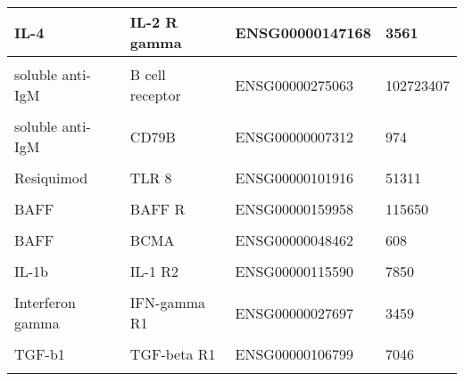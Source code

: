 \documentclass[11pt, a4paper, twosided]{book}
\begin{document}
\begin{table}
\begin{tabular}[t]{l|l|l|l}
\hline
IL-4 & IL-2 R gamma & ENSG00000147168 & 3561\\
\hline
\cellcolor[HTML]{E2E868}{IL-4} & \cellcolor[HTML]{E2E868}{IL-13 R A1} & \cellcolor[HTML]{E2E868}{ENSG00000131724} & \cellcolor[HTML]{E2E868}{3597}\\
\hline
soluble anti-IgM & B cell receptor & ENSG00000275063 & 102723407\\
\hline
\cellcolor[HTML]{E2E868}{soluble anti-IgM} & \cellcolor[HTML]{E2E868}{CD79A} & \cellcolor[HTML]{E2E868}{ENSG00000105369} & \cellcolor[HTML]{E2E868}{973}\\
\hline
soluble anti-IgM & CD79B & ENSG00000007312 & 974\\
\hline
\cellcolor[HTML]{E2E868}{Resiquimod} & \cellcolor[HTML]{E2E868}{TLR 7} & \cellcolor[HTML]{E2E868}{ENSG00000196664} & \cellcolor[HTML]{E2E868}{51284 }\\
\hline
Resiquimod & TLR 8 & ENSG00000101916 & 51311\\
\hline
\cellcolor[HTML]{E2E868}{CpG ODN} & \cellcolor[HTML]{E2E868}{TLR9} & \cellcolor[HTML]{E2E868}{ENSG00000239732} & \cellcolor[HTML]{E2E868}{54106}\\
\hline
BAFF & BAFF R & ENSG00000159958 & 115650\\
\hline
\cellcolor[HTML]{E2E868}{BAFF} & \cellcolor[HTML]{E2E868}{TACI} & \cellcolor[HTML]{E2E868}{ENSG00000240505} & \cellcolor[HTML]{E2E868}{23495}\\
\hline
BAFF & BCMA & ENSG00000048462 & 608\\
\hline
\cellcolor[HTML]{E2E868}{IL-1b} & \cellcolor[HTML]{E2E868}{IL-1 R1} & \cellcolor[HTML]{E2E868}{ENSG00000115594} & \cellcolor[HTML]{E2E868}{3554}\\
\hline
IL-1b & IL-1 R2 & ENSG00000115590 & 7850\\
\hline
\cellcolor[HTML]{E2E868}{sCD40L} & \cellcolor[HTML]{E2E868}{CD40} & \cellcolor[HTML]{E2E868}{ENSG00000101017} & \cellcolor[HTML]{E2E868}{958}\\
\hline
Interferon gamma & IFN-gamma R1 & ENSG00000027697 & 3459\\
\hline
\cellcolor[HTML]{E2E868}{Interferon gamma} & \cellcolor[HTML]{E2E868}{IFN-gamma R2} & \cellcolor[HTML]{E2E868}{ENSG00000159128} & \cellcolor[HTML]{E2E868}{3460}\\
\hline
TGF-b1 & TGF-beta R1 & ENSG00000106799 & 7046\\
\hline
\cellcolor[HTML]{E2E868}{TGF-b1} & \cellcolor[HTML]{E2E868}{TGF-beta R2} & \cellcolor[HTML]{E2E868}{ENSG00000163513} & \cellcolor[HTML]{E2E868}{7048}\\
\hline
\end{tabular}
\end{table}
\end{document}
